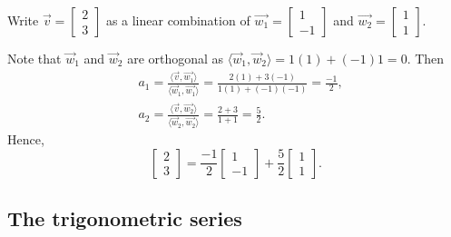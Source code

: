 \begin{example}
Write
$\vec{v} = \left[ \begin{smallmatrix} 2 \\ 3 \end{smallmatrix} \right]$
as a linear combination of 
$\vec{w_1} = \left[ \begin{smallmatrix} 1 \\ -1 \end{smallmatrix} \right]$
and
$\vec{w_2} = \left[ \begin{smallmatrix} 1 \\ 1 \end{smallmatrix} \right]$.

Note that $\vec{w}_1$ and $\vec{w}_2$ are orthogonal
as $\langle \vec{w}_1 , \vec{w}_2 \rangle = 1(1) + (-1)1 = 0$.
Then
\begin{align*}
& a_1 = 
\frac{\langle \vec{v} , \vec{w_1} \rangle}{
\langle \vec{w}_1 , \vec{w_1} \rangle}
=
\frac{2(1) + 3(-1)}{1(1) + (-1)(-1)} = \frac{-1}{2} ,
\\
& a_2 = 
\frac{\langle \vec{v} , \vec{w_2} \rangle}{
\langle \vec{w}_2 , \vec{w_2} \rangle}
=
\frac{2 + 3}{1 + 1} = \frac{5}{2} .
\end{align*}
Hence,
\begin{equation*}
\begin{bmatrix} 2 \\ 3 \end{bmatrix}
=
\frac{-1}{2}
\begin{bmatrix} 1 \\ -1 \end{bmatrix}
+
\frac{5}{2}
\begin{bmatrix} 1 \\ 1 \end{bmatrix} .
\end{equation*}
\end{example}

\subsection{The trigonometric series}

